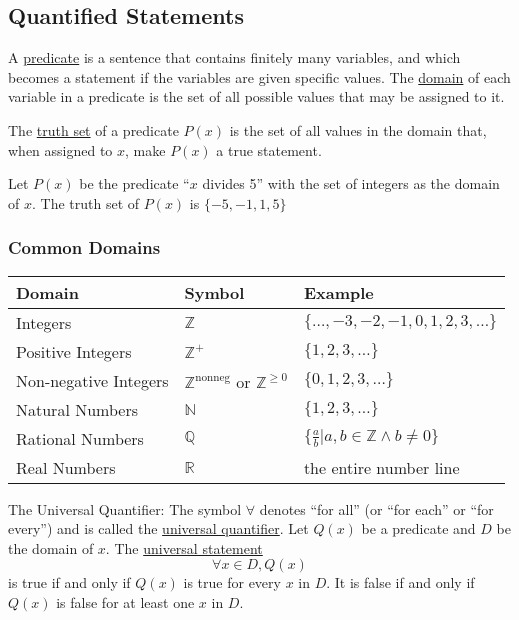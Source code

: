 \subsection{Quantified Statements}
\begin{definition}
    A \underline{predicate} is a sentence that contains finitely many variables, and which becomes a statement if the variables are given specific values. The \underline{domain} of each variable in a predicate is the set of all possible values that may be assigned to it.
\end{definition}

\begin{definition}
    The \underline{truth set} of a predicate $P(x)$ is the set of all values in the domain that, when assigned to $x$, make $P(x)$ a true statement.
\end{definition}

\begin{example}
    Let $P(x)$ be the predicate ``$x$ divides 5'' with the set of integers as the domain of $x$. The truth set of $P(x)$ is $\{-5,-1,1,5\}$
\end{example}

\subsubsection{Common Domains}
\begin{table}[H]
\begin{tabular}{|l|l|l|}
\hline
Domain & Symbol & Example \\
\hline
Integers & $\mathbb{Z}$ & $\{\dots,-3,-2,-1,0,1,2,3,\dots\}$ \\
Positive Integers & $\mathbb{Z}^+$ & $\{1,2,3,\dots\}$ \\
Non-negative Integers & $\mathbb{Z}^\text{nonneg} \text{ or } \mathbb{Z}^{\geq 0}$ & $\{0,1,2,3,\dots\}$ \\
Natural Numbers & $\mathbb{N}$ & $\{1,2,3,\dots\}$ \\
Rational Numbers & $\mathbb{Q}$ & $\{\frac{a}{b} | a,b\in\mathbb Z \land b\neq 0\}$ \\
Real Numbers & $\mathbb{R}$ & the entire number line \\
\hline
\end{tabular}
\end{table}

\begin{definition}
    The Universal Quantifier: The symbol $\forall$ denotes ``for all'' (or ``for each'' or ``for every'') and is called the \underline{universal quantifier}. Let $Q(x)$ be a predicate and $D$ be the domain of $x$. The \underline{universal statement} $$\forall x\in D, Q(x)$$ is true if and only if $Q(x)$ is true for every $x$ in $D$. It is false if and only if $Q(x)$ is false for at least one $x$ in $D$.
\end{definition}


